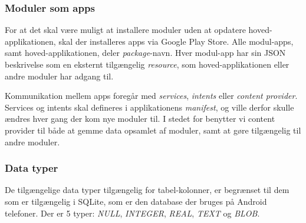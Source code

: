 \subsubsection{Moduler som apps}
For at det skal være muligt at installere moduler uden at opdatere hoved-applikationen, skal der installeres apps via Google Play Store.
Alle modul-apps, samt hoved-applikationen, deler \textit{package}-navn.
Hver modul-app har sin JSON beskrivelse som en eksternt tilgængelig \textit{resource}, som hoved-applikationen eller andre moduler har adgang til.

Kommunikation mellem apps foregår med \textit{services}, \textit{intents} eller \textit{content provider}.
Services og intents skal defineres i applikationens \textit{manifest}, og ville derfor skulle ændres hver gang der kom nye moduler til.
I stedet for benytter vi content provider til både at gemme data opsamlet af moduler, samt at gøre tilgængelig til andre moduler.

\subsubsection{Data typer}
De tilgængelige data typer tilgængelig for tabel-kolonner, er begrænset til dem som er tilgængelig i SQLite, som er den database der bruges på Android telefoner.
Der er 5 typer: \textit{NULL}, \textit{INTEGER}, \textit{REAL}, \textit{TEXT} og \textit{BLOB}.
